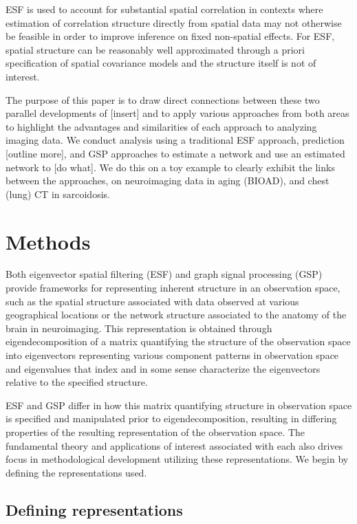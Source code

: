 \documentclass[12pt]{article}
\begin{document}
ESF is used to account for substantial spatial correlation in contexts where estimation of correlation structure directly from spatial data may not otherwise be feasible in order to improve inference on fixed non-spatial effects. For ESF, spatial structure can be reasonably well approximated through a priori specification of spatial covariance models and the structure itself is not of interest.

The purpose of this paper is to draw direct connections between these two parallel developments of [insert] and to apply various approaches from both areas to highlight the advantages and similarities of each approach to analyzing imaging data. We conduct analysis using a traditional ESF approach, prediction [outline more], and GSP approaches to estimate a network and use an estimated network to [do what]. We do this on a toy example to clearly exhibit the links between the approaches, on neuroimaging data in aging (BIOAD), and chest (lung) CT in sarcoidosis.

\section{Methods}

Both eigenvector spatial filtering (ESF) and graph signal processing (GSP) provide frameworks for representing inherent structure in an observation space, such as the spatial structure associated with data observed at various geographical locations or the network structure associated to the anatomy of the brain in neuroimaging. This representation is obtained through eigendecomposition of a matrix quantifying the structure of the observation space into eigenvectors representing various component patterns in observation space and eigenvalues that index and in some sense characterize the eigenvectors relative to the specified structure.

ESF and GSP differ in how this matrix quantifying structure in observation space is specified and manipulated prior to eigendecomposition, resulting in differing properties of the resulting representation of the observation space. The fundamental theory and applications of interest associated with each also drives focus in methodological development utilizing these representations. We begin by defining the representations used.

\subsection{Defining representations}
\end{document}
